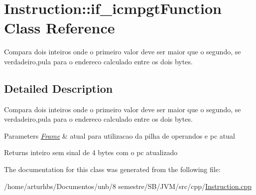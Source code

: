 \hypertarget{classInstruction_1_1if__icmpgtFunction}{}\section{Instruction\+:\+:if\+\_\+icmpgt\+Function Class Reference}
\label{classInstruction_1_1if__icmpgtFunction}


Compara dois inteiros onde o primeiro valor deve ser maior que o segundo, se verdadeiro,pula para o endereco calculado entre os dois bytes.  




\subsection{Detailed Description}
Compara dois inteiros onde o primeiro valor deve ser maior que o segundo, se verdadeiro,pula para o endereco calculado entre os dois bytes. 


\begin{DoxyParams}{Parameters}
{\em \hyperlink{classFrame}{Frame}} & atual para utilizacao da pilha de operandos e pc atual \\
\hline
\end{DoxyParams}
\begin{DoxyReturn}{Returns}
inteiro sem sinal de 4 bytes com o pc atualizado 
\end{DoxyReturn}


The documentation for this class was generated from the following file\+:\begin{DoxyCompactItemize}
\item 
/home/arturhbs/\+Documentos/unb/8 semestre/\+S\+B/\+J\+V\+M/src/cpp/\hyperlink{Instruction_8cpp}{Instruction.\+cpp}\end{DoxyCompactItemize}
